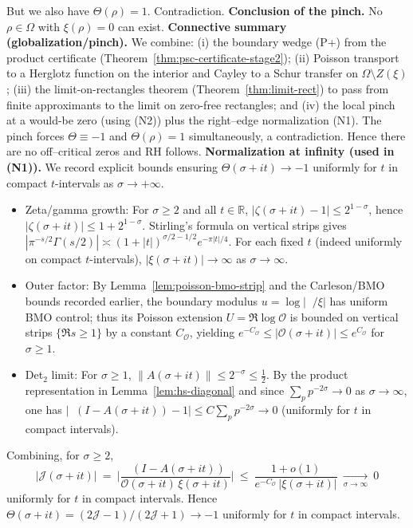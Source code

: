 \documentclass[11pt]{article}
\theoremstyle{definition}
\theoremstyle{remark}
\newcommand{\R}{\mathbb{R}}
\DeclareMathOperator{\dettwo}{det_2}
\begin{document}
But we also have $\Theta(\rho)=1$. Contradiction.
\medskip
\noindent\textbf{Conclusion of the pinch.}
No $\rho\in\Omega$ with $\xi(\rho)=0$ can exist.
\medskip
\noindent\textbf{Connective summary (globalization/pinch).}
We combine: (i) the boundary wedge (P+) from the product certificate (Theorem~\ref{thm:psc-certificate-stage2}); (ii) Poisson transport to a Herglotz function on the interior and Cayley to a Schur transfer on $\Omega\setminus Z(\xi)$; (iii) the limit-on-rectangles theorem (Theorem~\ref{thm:limit-rect}) to pass from finite approximants to the limit on zero-free rectangles; and (iv) the local pinch at a would-be zero (using (N2)) plus the right–edge normalization (N1). The pinch forces $\Theta\equiv -1$ and $\Theta(\rho)=1$ simultaneously, a contradiction. Hence there are no off–critical zeros and RH follows.
\medskip
\noindent\textbf{Normalization at infinity (used in (N1)).}
We record explicit bounds ensuring $\Theta(\sigma+it)\to-1$ uniformly for $t$ in compact $t$-intervals as $\sigma\to+\infty$.
\begin{itemize}
\item Zeta/gamma growth: For $\sigma\ge 2$ and all $t\in\R$, $|\zeta(\sigma+it)-1|\le 2^{1-\sigma}$, hence $|\zeta(\sigma+it)|\le 1+2^{1-\sigma}$. Stirling's formula on vertical strips gives $|\pi^{-s/2}\Gamma(s/2)|\asymp (1+|t|)^{\sigma/2-1/2} e^{-\pi|t|/4}$. For each fixed $t$ (indeed uniformly on compact $t$-intervals), $|\xi(\sigma+it)|\to\infty$ as $\sigma\to\infty$.
\item Outer factor: By Lemma~\ref{lem:poisson-bmo-strip} and the Carleson/BMO bounds recorded earlier, the boundary modulus $u=\log|\dettwo/\xi|$ has uniform BMO control; thus its Poisson extension $U=\Re\log\mathcal O$ is bounded on vertical strips $\{\Re s\ge 1\}$ by a constant $C_\mathcal O$, yielding $e^{-C_\mathcal O}\le |\mathcal O(\sigma+it)|\le e^{C_\mathcal O}$ for $\sigma\ge 1$.
\item Det$_2$ limit: For $\sigma\ge 1$, $\|A(\sigma+it)\|\le 2^{-\sigma}\le \tfrac12$. By the product representation in Lemma~\ref{lem:hs-diagonal} and since $\sum_p p^{-2\sigma}\to0$ as $\sigma\to\infty$, one has $|\dettwo(I-A(\sigma+it)) - 1|\le C\sum_p p^{-2\sigma}\to 0$ (uniformly for $t$ in compact intervals).
\end{itemize}
Combining, for $\sigma\ge 2$,
\[
  \big|\mathcal J(\sigma+it)\big|\ =\ \Big|\frac{\dettwo(I-A(\sigma+it))}{\mathcal O(\sigma+it)\,\xi(\sigma+it)}\Big|\ \le\ \frac{1+ o(1)}{e^{-C_\mathcal O}\,|\xi(\sigma+it)|}\ \xrightarrow[\sigma\to\infty]{}\ 0
\]
uniformly for $t$ in compact intervals. Hence $\Theta(\sigma+it)=(2\mathcal J-1)/(2\mathcal J+1)\to -1$ uniformly for $t$ in compact intervals.
\end{document}
